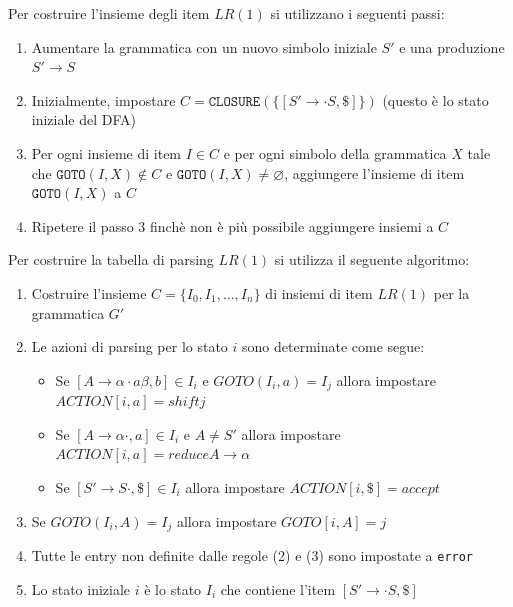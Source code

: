 \documentclass[a4paper]{article}
\begin{document}
Per costruire l'insieme degli item \( LR(1) \) si utilizzano i seguenti passi:
\begin{enumerate}
  \item Aumentare la grammatica con un nuovo simbolo iniziale \( S' \) e una
    produzione \( S' \to S \)

  \item Inizialmente, impostare \( C = \texttt{CLOSURE}(\{ [S' \to \cdot S, \$] \}) \)
    (questo è lo stato iniziale del DFA)

  \item Per ogni insieme di item \( I \in C \) e per ogni simbolo della grammatica
    \( X \) tale che \( \texttt{GOTO}(I, X) \notin C \) e \( \texttt{GOTO}(I, X) \neq
    \varnothing \), aggiungere l'insieme di item \( \texttt{GOTO}(I, X) \) a \( C \)

  \item Ripetere il passo 3 finchè non è più possibile aggiungere insiemi a \( C \)
\end{enumerate}
Per costruire la tabella di parsing \( LR(1) \) si utilizza il seguente algoritmo:
\begin{enumerate}
  \item Costruire l'insieme \( C = \{ I_0, I_1, \ldots, I_n \} \) di insiemi di item
    \( LR(1) \) per la grammatica \( G' \)

  \item Le azioni di parsing per lo stato \( i \) sono determinate come segue:
    \begin{itemize}
      \item Se \( [ A \to \alpha \cdot a \beta, b ] \in I_i \) e \( GOTO(I_i, a) = I_j \) 
        allora impostare \( ACTION[i, a] = shift j \)

      \item Se \( [ A \to \alpha \cdot, a ] \in I_i \) e \( A \neq S' \) allora impostare
        \( ACTION[i, a] = reduce A \to \alpha \)

      \item Se \( [ S' \to S \cdot, \$ ] \in I_i \) allora impostare
        \( ACTION[i, \$] = accept \)
    \end{itemize}

  \item Se \( GOTO(I_i, A) = I_j \) allora impostare \( GOTO[i, A] = j \)

  \item Tutte le entry non definite dalle regole (2) e (3) sono impostate a \texttt{error}

  \item Lo stato iniziale \( i \) è lo stato \( I_i \) che contiene l'item
    \( [ S' \to \cdot S, \$ ] \)
\end{enumerate}
\end{document}
